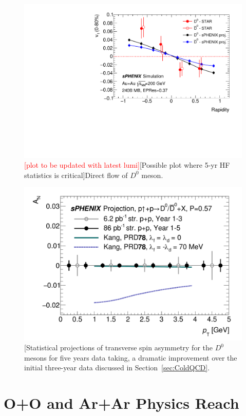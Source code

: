 \begin{figure}[h]
\begin{center}
\includegraphics[width=.49\linewidth]{figs/v1_proj_240B_1.pdf}
\caption{ {\textcolor{red}{[plot to be updated with latest lumi]}}[Possible plot where  5-yr HF statistics is critical]Direct flow of $D^0$ meson.}
\label{fig:v1-D0}
\end{center}
\end{figure}
 


\begin{figure}[h]
\begin{center}
\includegraphics[width=.49\linewidth]{figs/D0_BUP2020_AN_5yr_comparison.pdf}
\caption{[Statistical projections of
  transverse spin asymmetry for the $D^0$ mesons for
  five years data taking, a dramatic improvement over the initial three-year data discussed in Section~\ref{sec:ColdQCD}. }
\label{fig:AN-D0}
\end{center}
\end{figure}




\FloatBarrier

\section{O+O and Ar+Ar Physics Reach}

